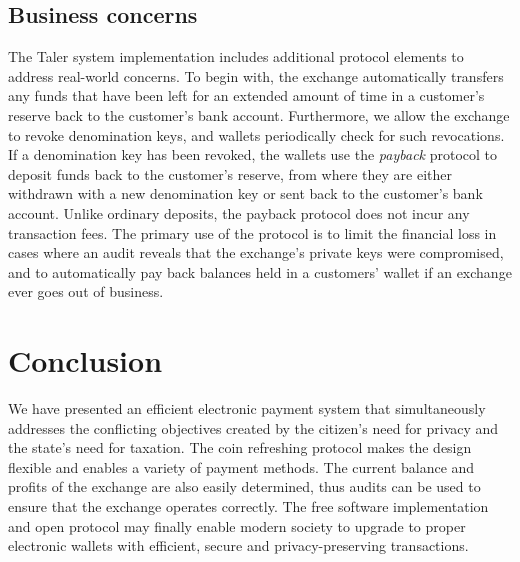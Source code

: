 \documentclass[sigconf, authordraft]{acmart}
\begin{document}
\subsection{Business concerns}

The Taler system implementation includes additional protocol elements
to address real-world concerns.  To begin with, the exchange
automatically transfers any funds that have been left for an extended
amount of time in a customer's reserve back to the customer's bank
account.  Furthermore, we allow the exchange to revoke denomination
keys, and wallets periodically check for such revocations.  If a
denomination key has been revoked, the wallets use the {\em payback}
protocol to deposit funds back to the customer's reserve, from where
they are either withdrawn with a new denomination key or sent back to
the customer's bank account.  Unlike ordinary deposits, the payback
protocol does not incur any transaction fees. The primary use of the
protocol is to limit the financial loss in cases where an audit
reveals that the exchange's private keys were compromised, and to
automatically pay back balances held in a customers' wallet if an
exchange ever goes out of business.


%


\section{Conclusion}

We have presented an efficient electronic payment system that
simultaneously addresses the conflicting objectives created by the
citizen's need for privacy and the state's need for taxation.  The
coin refreshing protocol makes the design flexible and enables a
variety of payment methods.  The current balance and profits of the
exchange are also easily determined, thus audits can be used to ensure
that the exchange operates correctly.  The free software
implementation and open protocol may finally enable modern society to
upgrade to proper electronic wallets with efficient, secure and
privacy-preserving transactions.
\end{document}
